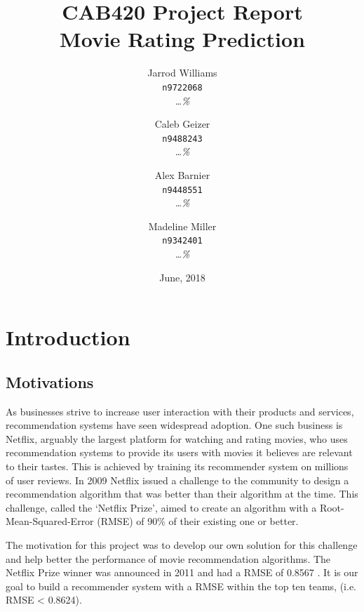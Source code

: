 \documentclass{report}
\begin{document}
	\title{CAB420 Project Report \\ \large{Movie Rating Prediction}}
	\author{
		Jarrod Williams\\
		\texttt{n9722068}\\
		\emph{\dots\%}
		\and 
		Caleb Geizer\\
		\texttt{n9488243}\\
		\emph{\dots\%}
		\and
		Alex Barnier\\
		\texttt{n9448551}\\
		\emph{\dots\%}
		\and	
		Madeline Miller\\
		\texttt{n9342401}\\
		\emph{\dots\%}
	}
	\date{June, 2018}
	\maketitle
	
	\chapter{Introduction}
	\section{Motivations}
	As businesses strive to increase user interaction with their products and services, recommendation systems have seen widespread adoption. One such business is Netflix, arguably the largest platform for watching and rating movies, who uses recommendation systems to provide its users with movies it believes are relevant to their tastes. This is achieved by training its recommender system on millions of user reviews. In 2009 Netflix issued a challenge to the community to design a recommendation algorithm that was better than their algorithm at the time. This challenge, called the ‘Netflix Prize’, aimed to create an algorithm with a Root-Mean-Squared-Error (RMSE) of 90\% of their existing one or better.
	
	The motivation for this project was to develop our own solution for this challenge and help better the performance of movie recommendation algorithms. The Netflix Prize winner was announced in 2011 and had a RMSE of 0.8567 \autocite{NeflixLeader}. It is our goal to build a recommender system with a RMSE within the top ten teams, (i.e. RMSE < 0.8624).
	
\end{document}
